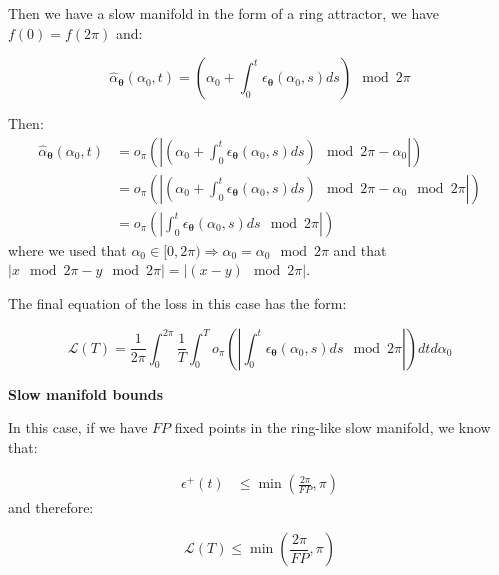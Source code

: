 \documentclass{article} %
\newcounter{ct}
\theoremstyle{definition}
\theoremstyle{remark}
\begin{document}

Then we have a slow manifold in the form of a ring attractor, we have $f(0) = f(2 \pi)$ and:

\begin{equation}
    \hat{\alpha}_{\boldsymbol{\theta}}(\alpha_0, t) = \left(\alpha_0 + \int_0^t \epsilon_{\bm{\theta}}(\alpha_0, s) ds \right)\mod 2 \pi
\end{equation}


Then: 
\begin{equation}
\begin{split}
    \hat{\alpha}_{\boldsymbol{\theta}}(\alpha_0, t) &= o_\pi \left( \left| \left(\alpha_0 + \int_0^t \epsilon_{\bm{\theta}}(\alpha_0, s) ds \right)\mod 2 \pi - \alpha_0 \right| \right)  \\
    &= o_\pi \left( \left| \left(\alpha_0 + \int_0^t \epsilon_{\bm{\theta}}(\alpha_0, s) ds \right)\mod 2 \pi - \alpha_0 \mod 2 \pi \right| \right) \\
    &= o_\pi \left( \left| \int_0^t \epsilon_{\bm{\theta}}(\alpha_0, s) ds \mod 2 \pi \right| \right)
\end{split}
\end{equation}
where we used that $\alpha_0 \in [0,2 \pi) \Rightarrow \alpha_0 = \alpha_0 \mod 2 \pi$ and that $|x \mod 2 \pi - y \mod 2 \pi| = |(x-y) \mod 2 \pi|$.

The final equation of the loss in this case has the form:

\begin{equation}
    \mathcal{L}(T) =  \frac{1}{2 \pi} \int_0^{2 \pi} \frac{1}{T} \int_0^T o_\pi \left( \left| \int_0^t \epsilon_{\bm{\theta}}(\alpha_0, s) ds \mod 2 \pi \right| \right) dt d\alpha_0
\end{equation}

\textbf{Slow manifold bounds}

In this case, if we have $FP$ fixed points in the ring-like slow manifold, we know that: 

\begin{equation}
\begin{split}
     \epsilon^+(t) &\leq \min \left( \frac{2 \pi}{FP}, \pi \right) 
\end{split}
\end{equation}
and therefore:

\begin{equation}
    \mathcal{L}(T) \leq \min \left( \frac{2 \pi}{FP}, \pi \right) 
\end{equation}
\end{document}

